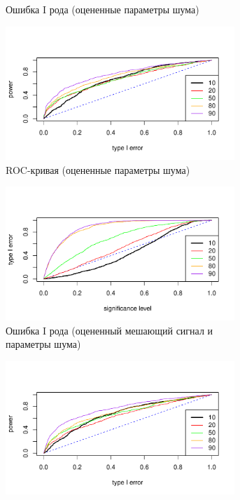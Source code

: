 \documentclass[specialist,
substylefile = spbu_report.rtx,
subf,href,colorlinks=true, 12pt]{disser}
\theoremstyle{definition}
\begin{document}
\begin{figure}[h!]
\begin{subfigure}[t]{0.5\textwidth}
		\caption{Ошибка I рода (оцененные параметры шума)}
		\label{fig:sin_est_noise_type1error}
	\end{subfigure}\hspace{\fill}
	\begin{subfigure}[t]{0.5\textwidth}
		\centering
		\includegraphics[width=0.95\textwidth]{img/roc_sin_est_noise.pdf}
		\caption{ROC-кривая (оцененные параметры шума)}
		\label{fig:sin_est_noise_roc}
	\end{subfigure}
	\begin{subfigure}[t]{0.5\textwidth}
		\centering
		\includegraphics[width=0.95\textwidth]{img/type1error_sin_est_noise_signal.pdf}
		\caption{Ошибка I рода (оцененный мешающий сигнал и параметры шума)}
		\label{fig:sin_est_noise_signal_type1error}
	\end{subfigure}\hspace{\fill}
	\begin{subfigure}[t]{0.5\textwidth}
		\centering
		\includegraphics[width=0.95\textwidth]{img/roc_sin_est_noise_signal.pdf}

\end{subfigure}
\end{figure}
\end{document}
